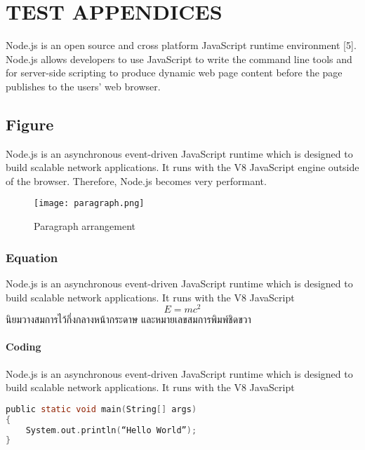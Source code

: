 \chapter{TEST APPENDICES}

Node.js is an open source and cross platform JavaScript runtime environment [5]. Node.js allows developers to use JavaScript to write the command line tools and for server-side scripting to produce dynamic web page content before the page publishes to the users’ web browser.

\section{Figure}
Node.js is an asynchronous event-driven JavaScript runtime which is designed to build scalable network applications. It runs with the V8 JavaScript engine outside of the browser. Therefore, Node.js becomes very performant.

\begin{figure}[htbp]
    \centering
\texttt{[image: paragraph.png]}
    \caption{Paragraph arrangement}
    \label{fig:paragraph}
\end{figure}

\subsection{Equation}
Node.js is an asynchronous event-driven JavaScript runtime which is designed to build scalable network applications. It runs with the V8 JavaScript
\begin{equation}
E=mc^{2}
\end{equation}
นิยมวางสมการไว้กึ่งกลางหน้ากระดาษ และหมายเลขสมการพิมพ์ชิดขวา

\subsubsection{Coding}
Node.js is an asynchronous event-driven JavaScript runtime which is designed to build scalable network applications. It runs with the V8 JavaScript 

\begin{lstlisting}[language=C]
public static void main(String[] args)
{
	System.out.println(“Hello World”);
}
\end{lstlisting}
